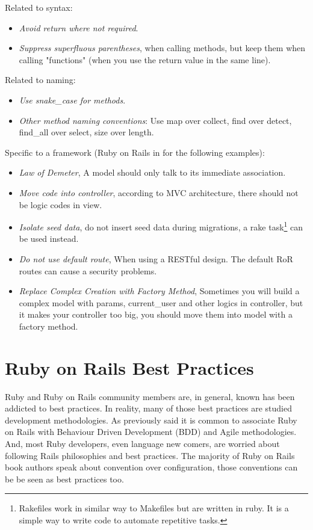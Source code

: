 Related to syntax:
\begin{itemize}
\item \emph{Avoid return where not required}.
\item \emph{Suppress superfluous parentheses}, when calling methods, 
but keep them when calling "functions" (when you use the return value in the same line).
\end{itemize}

Related to naming:
\begin{itemize}
\item \emph{Use snake\_case for methods}.
\item \emph{Other method naming conventions}: Use map over collect, find over detect, find\_all over select, size over length.
\end{itemize}

Specific to a framework (Ruby on Rails in for the following examples):
\begin{itemize}
\item \emph{Law of Demeter}, A model should only talk to its immediate association.
\item \emph{Move code into controller}, according to MVC architecture, there should not be logic codes in view.
\item \emph{Isolate seed data}, do not insert seed data during migrations, a 
rake task\footnote{ 
  Rakefiles work in similar way to Makefiles but are written in ruby. It is a simple way to write code to automate repetitive tasks. 
} can be used instead.
\item \emph{Do not use default route}, When using a RESTful design. The default RoR routes can cause a security problems.
\item \emph{Replace Complex Creation with Factory Method}, Sometimes you will build a complex model with params, current\_user and other logics in controller, but it makes your controller too big, you should move them into model with a factory method.
\end{itemize}




\section{Ruby on Rails Best Practices} \label{sec:ror_best_practives}

Ruby and Ruby on Rails community members are, in general, known has been addicted to best practices.
In reality, many of those best practices are studied development methodologies.
As previously said it is common to associate Ruby on Rails with Behaviour Driven Development (BDD) and Agile methodologies.
And, most Ruby developers, even language new comers, are worried about following Rails philosophies and best practices.
The majority of Ruby on Rails book authors speak about convention over configuration,
those conventions can be be seen as best practices too.

